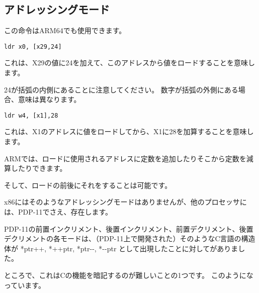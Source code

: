 ﻿\subsection{アドレッシングモード}
\label{ARM_postindex_vs_preindex}
\myindex{\CLanguageElements!\PostIncrement}
\myindex{\CLanguageElements!\PostDecrement}
\myindex{\CLanguageElements!\PreIncrement}
\myindex{\CLanguageElements!\PreDecrement}

この命令はARM64でも使用できます。

\begin{lstlisting}[style=customasmARM]
ldr	x0, [x29,24]
\end{lstlisting}

これは、X29の値に24を加えて、このアドレスから値をロードすることを意味します。

24が括弧の内側にあることに注意してください。
数字が括弧の外側にある場合、意味は異なります。

\begin{lstlisting}[style=customasmARM]
ldr	w4, [x1],28
\end{lstlisting}

これは、X1のアドレスに値をロードしてから、X1に28を加算することを意味します。


ARMでは、ロードに使用されるアドレスに定数を追加したりそこから定数を減算したりできます。

そして、ロードの前後にそれをすることは可能です。

x86にはそのようなアドレッシングモードはありませんが、他のプロセッサには、PDP-11でさえ、存在します。

PDP-11の前置インクリメント、後置インクリメント、前置デクリメント、後置デクリメントの各モードは、（PDP-11上で開発された）そのようなC言語の構造体が
*ptr++, *++ptr, *ptr-{}-, *-{}-ptr として出現したことに対してがありました。

ところで、これはCの機能を暗記するのが難しいことの1つです。
このようになっています。

